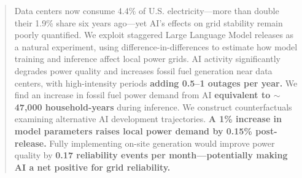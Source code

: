 \documentclass[sigconf,authordraft]{acmart}
\begin{document}
\begin{abstract}


Data centers now consume 4.4\% of U.S. electricity—more than double their 1.9\% share six years ago—yet AI's effects on grid stability remain poorly quantified. We exploit staggered Large Language Model releases as a natural experiment, using difference-in-differences to estimate how model training and inference affect local power grids. AI activity significantly degrades power quality and increases fossil fuel generation near data centers, with high-intensity periods \textbf{adding 0.5–1 outages per year.} We find an increase in fossil fuel power demand from AI \textbf{equivalent to $\sim$ 47,000 household-years} during inference.
We construct counterfactuals examining alternative AI development trajectories. \textbf{A 1\% increase in model parameters raises local power demand by 0.15\% post-release.} Fully implementing on-site generation would improve power quality by \textbf{0.17 reliability events per month—potentially making AI a net positive for grid reliability.}

\end{abstract}
\end{document}
